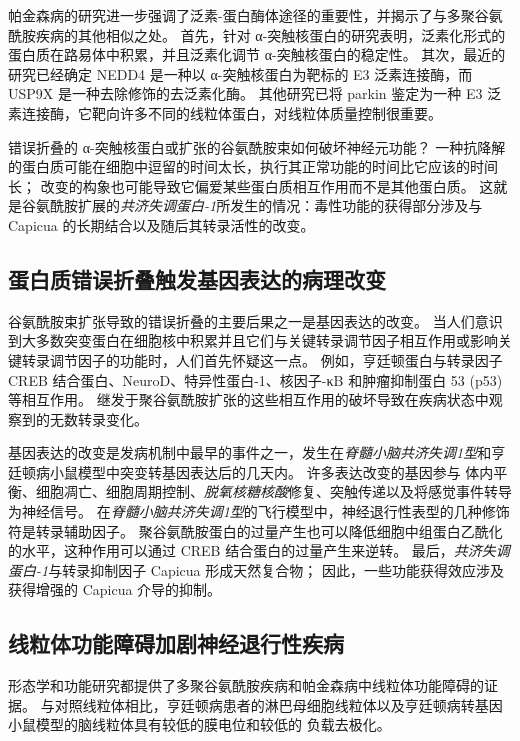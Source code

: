 帕金森病的研究进一步强调了泛素-蛋白酶体途径的重要性，并揭示了与多聚谷氨酰胺疾病的其他相似之处。
首先，针对 α-突触核蛋白的研究表明，泛素化形式的蛋白质在路易体中积累，并且泛素化调节 α-突触核蛋白的稳定性。
其次，最近的研究已经确定 NEDD4 是一种以 α-突触核蛋白为靶标的 E3 泛素连接酶，而 USP9X 是一种去除修饰的去泛素化酶。
其他研究已将 parkin 鉴定为一种 E3 泛素连接酶，它靶向许多不同的线粒体蛋白，对线粒体质量控制很重要。


错误折叠的 α-突触核蛋白或扩张的谷氨酰胺束如何破坏神经元功能？
一种抗降解的蛋白质可能在细胞中逗留的时间太长，执行其正常功能的时间比它应该的时间长；
改变的构象也可能导致它偏爱某些蛋白质相互作用而不是其他蛋白质。
这就是谷氨酰胺扩展的\textit{共济失调蛋白-1}所发生的情况：毒性功能的获得部分涉及与 Capicua 的长期结合以及随后其转录活性的改变。



\subsection{蛋白质错误折叠触发基因表达的病理改变}

谷氨酰胺束扩张导致的错误折叠的主要后果之一是基因表达的改变。
当人们意识到大多数突变蛋白在细胞核中积累并且它们与关键转录调节因子相互作用或影响关键转录调节因子的功能时，人们首先怀疑这一点。
例如，亨廷顿蛋白与转录因子 CREB 结合蛋白、NeuroD、特异性蛋白-1、核因子-κB 和肿瘤抑制蛋白 53 (p53) 等相互作用。
继发于聚谷氨酰胺扩张的这些相互作用的破坏导致在疾病状态中观察到的无数转录变化。


基因表达的改变是发病机制中最早的事件之一，发生在\textit{脊髓小脑共济失调1型}和亨廷顿病小鼠模型中突变转基因表达后的几天内。
许多表达改变的基因参与  体内平衡、细胞凋亡、细胞周期控制、\textit{脱氧核糖核酸}修复、突触传递以及将感觉事件转导为神经信号。
在\textit{脊髓小脑共济失调1型}的飞行模型中，神经退行性表型的几种修饰符是转录辅助因子。
聚谷氨酰胺蛋白的过量产生也可以降低细胞中组蛋白乙酰化的水平，这种作用可以通过 CREB 结合蛋白的过量产生来逆转。
最后，\textit{共济失调蛋白-1}与转录抑制因子 Capicua 形成天然复合物；
因此，一些功能获得效应涉及获得增强的 Capicua 介导的抑制。



\subsection{线粒体功能障碍加剧神经退行性疾病}

形态学和功能研究都提供了多聚谷氨酰胺疾病和帕金森病中线粒体功能障碍的证据。
与对照线粒体相比，亨廷顿病患者的淋巴母细胞线粒体以及亨廷顿病转基因小鼠模型的脑线粒体具有较低的膜电位和较低的  负载去极化。


